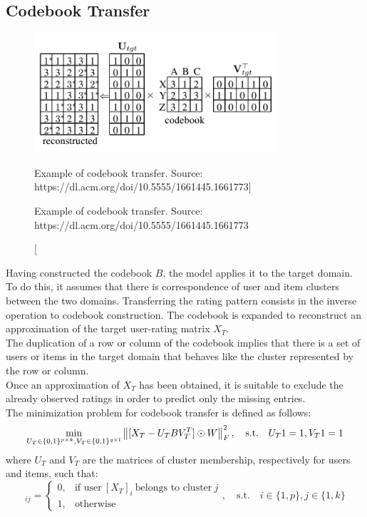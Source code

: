 \subsection{Codebook Transfer}
\label{ss:codebook-transfer}

\begin{figure}[hbt]
\centering
\includegraphics[width=0.8\textwidth]{pictures/codebook-transfer}
\caption
[Example of codebook transfer. Source: https://dl.acm.org/doi/10.5555/1661445.1661773]
{\protect\raggedright Example of codebook transfer. Source: https://dl.acm.org/doi/10.5555/1661445.1661773}
\end{figure}
Having constructed the codebook $B$, the model applies it to the target domain. To do this, it assumes that there is correspondence of user and item clusters between the two domains. Transferring the rating pattern consists in the inverse operation to codebook construction. The codebook is expanded to reconstruct an approximation of the target user-rating matrix $X_T$.\\
The duplication of a row or column of the codebook implies that there is a set of users or items in the target domain that behaves like the cluster represented by the row or column.\\
Once an approximation of $X_T$ has been obtained, it is suitable to exclude the already observed ratings in order to predict only the missing entries.\\
The minimization problem for codebook transfer is defined as follows:
\begin{equation}
\min_{U_T \in \{0,1\}^{p \times k}, V_T \in \{0,1\}^{q \times l}} \left\lVert[X_T - U_T B V_T^T] \odot W\right\rVert_F^2, \quad \text{s.t.} \quad U_T 1 = 1, V_T 1 = 1
\end{equation}
where $U_T$ and $V_T$ are the matrices of cluster membership, respectively for users and items, such that:
\begin{equation}
[U_T]_{ij} =
\begin{cases}
0, & \text{if user}\ [X_T]_{i}\ \text{belongs to cluster}\ j\\
1, & \text{otherwise}
\end{cases}
, \quad \text{s.t.} \quad i \in \{1,p\}, j \in \{1,k\}
\end{equation}
